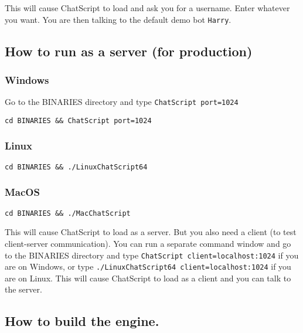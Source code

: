 \documentclass[]{article}
\begin{document}
This will cause ChatScript to load and ask you for a username. Enter
whatever you want. You are then talking to the default demo bot
\texttt{Harry}.

\subsection{How to run as a server (for
production)}\label{how-to-run-as-a-server-for-production}

\subsubsection{Windows}\label{windows-1}

Go to the BINARIES directory and type \texttt{ChatScript\ port=1024}

\begin{verbatim}
cd BINARIES && ChatScript port=1024
\end{verbatim}

\subsubsection{Linux}\label{linux-1}

\begin{verbatim}
cd BINARIES && ./LinuxChatScript64
\end{verbatim}

\subsubsection{MacOS}\label{macos-1}

\begin{verbatim}
cd BINARIES && ./MacChatScript
\end{verbatim}

This will cause ChatScript to load as a server. But you also need a
client (to test client-server communication). You can run a separate
command window and go to the BINARIES directory and type
\texttt{ChatScript\ client=localhost:1024} if you are on Windows, or
type \texttt{./LinuxChatScript64\ client=localhost:1024} if you are on
Linux. This will cause ChatScript to load as a client and you can talk
to the server.

\subsection{How to build the engine.}\label{how-to-build-the-engine.}
\end{document}

